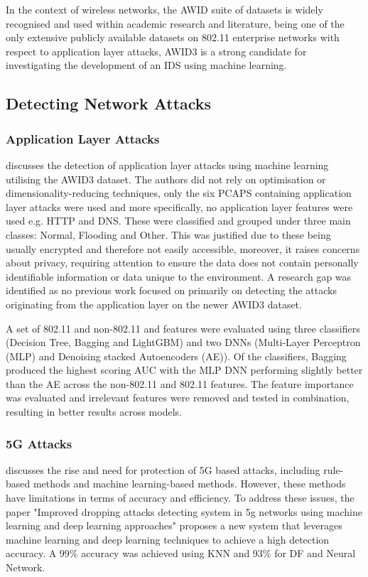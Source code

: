 In the context of wireless networks, the AWID suite of datasets is widely recognised and used within academic research and literature, being one of the only extensive publicly available datasets on 802.11 enterprise networks with respect to application layer attacks, AWID3 is a strong candidate for investigating the development of an IDS using machine learning. 

\subsection{Detecting Network Attacks}

\subsubsection*{Application Layer Attacks}

\cite{s22155633} discusses the detection of application layer attacks using machine learning utilising the AWID3 dataset. The authors did not rely on optimisation or dimensionality-reducing techniques, only the six PCAPS containing application layer attacks were used and more specifically, no application layer features were used e.g. HTTP and DNS. These were classified and grouped under three main classes: Normal, Flooding and Other. This was justified due to these being usually encrypted and therefore not easily accessible, moreover, it raises concerns about privacy, requiring attention to ensure the data does not contain personally identifiable information or data unique to the environment. A research gap was identified as no previous work focused on primarily on detecting the attacks originating from the application layer on the newer AWID3 dataset.

A set of 802.11 and non-802.11 and features were evaluated using three classifiers (Decision Tree, Bagging and LightGBM) and two DNNs (Multi-Layer Perceptron (MLP) and Denoising stacked Autoencoders (AE)). Of the classifiers, Bagging produced the highest scoring AUC with the MLP DNN performing slightly better than the AE across the non-802.11 and 802.11 features. The feature importance was evaluated and irrelevant features were removed and tested in combination, resulting in better results across models. 

\subsubsection*{5G Attacks}

\cite{Mughaid2022} discusses the rise and need for protection of 5G based attacks, including rule-based methods and machine learning-based methods. However, these methods have limitations in terms of accuracy and efficiency. To address these issues, the paper "Improved dropping attacks detecting system in 5g networks using machine learning and deep learning approaches" proposes a new system that leverages machine learning and deep learning techniques to achieve a high detection accuracy. A 99\% accuracy was achieved using KNN and 93\% for DF and Neural Network.

